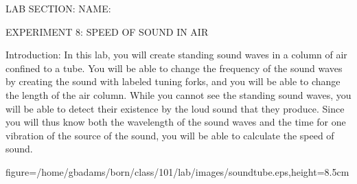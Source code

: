 
\baselineskip=15pt
\vglue-0.7in
\hglue-2.0cm LAB SECTION:
\underbar{~~~~~~~~~~~~~~~~~~~~~~~~~~~~~~~~~~~~~~~~~~~~~~}
 NAME:
\rlap{
\underbar{~~~~~~~~~~~~~~~~~~~~~~~~~~~~~~~~~~~~~~~~~~~~~~}
}
\bigskip
\bigskip
\bigskip
\centerline{EXPERIMENT 8: SPEED OF SOUND IN AIR}
\bigskip
Introduction:  In this lab, you will create standing
sound waves in a column of air confined to a tube.
You will be able to change the frequency of the sound 
waves by creating the sound with labeled tuning forks,
and you will be able to change the length of the air
column.  While you cannot see the standing sound waves, 
you will be able to detect their existence by the loud 
sound that they produce.  Since you will thus know both 
the wavelength of the sound waves and the time for one 
vibration of the source of the sound, you will be able 
to calculate the speed of sound.
\smallskip
\smallskip
\centerline{\psfig
{figure=/home/gbadams/born/class/101/lab/images/soundtube.eps,height=8.5cm}}
\smallskip
{}   

